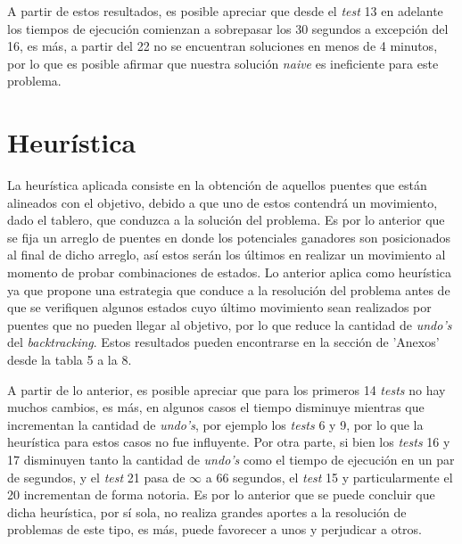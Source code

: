 \documentclass[12pt]{article}
\begin{document}
\hspace{5mm}
A partir de estos resultados, es posible apreciar que desde el \textit{test} 13 en adelante los tiempos de ejecución
comienzan a sobrepasar los 30 segundos a excepción del 16, es más, a partir del 22 no se encuentran soluciones en 
menos de 4 minutos, por lo que es posible afirmar que nuestra solución \textit{naive} es ineficiente para este problema.

\newpage

\section*{Heurística}
\hspace{5mm}
La heurística aplicada consiste en la obtención de aquellos puentes que están alineados con el objetivo, debido a que 
uno de estos contendrá un movimiento, dado el tablero, que conduzca a la solución del problema. Es por lo anterior que se
fija un arreglo de puentes en donde los potenciales ganadores son posicionados al final de dicho arreglo, así estos serán
los últimos en realizar un movimiento al momento de probar combinaciones de estados. Lo anterior aplica como heurística ya
que propone una estrategia que conduce a la resolución del problema antes de que se verifiquen algunos estados cuyo último
movimiento sean realizados por puentes que no pueden llegar al objetivo, por lo que reduce la cantidad de \textit{undo's}
del \textit{backtracking}. Estos resultados pueden encontrarse en la sección de 'Anexos' desde la tabla 5 a la 8.

\hspace{5mm}
A partir de lo anterior, es posible apreciar que para los primeros 14 \textit{tests} no hay muchos cambios, es más, 
en algunos casos el tiempo disminuye mientras que incrementan la cantidad de \textit{undo's}, por ejemplo los
\textit{tests} 6 y 9, por lo que la heurística para estos casos no fue influyente. Por otra parte, si bien los
\textit{tests} 16 y 17 disminuyen tanto la cantidad de \textit{undo's} como el tiempo de ejecución en un par de 
segundos, y el \textit{test} 21 pasa de $\infty$ a 66 segundos, el \textit{test} 15 y particularmente el 20
incrementan de forma notoria. Es por lo anterior que se puede concluir que dicha heurística, por sí sola, no realiza
grandes aportes a la resolución de problemas de este tipo, es más, puede favorecer a unos y perjudicar a otros.
\end{document}
